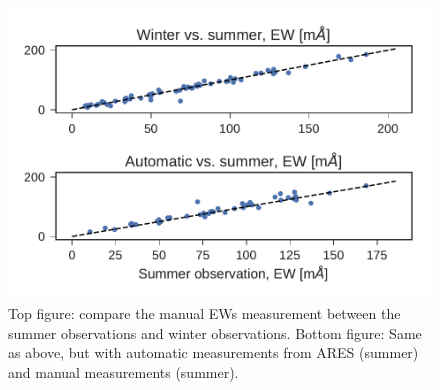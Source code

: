 \documentclass{aa}
\begin{document}
\begin{figure}[tpb]
    \centering
    \includegraphics[width=1.0\linewidth]{figures/EWcomp.pdf}
    \caption{Top figure: compare the manual EWs measurement between the summer
             observations and winter observations. Bottom figure: Same as above,
             but with automatic measurements from ARES (summer) and manual
             measurements (summer).}
    \label{fig:EWcomp}
\end{figure}
\end{document}
